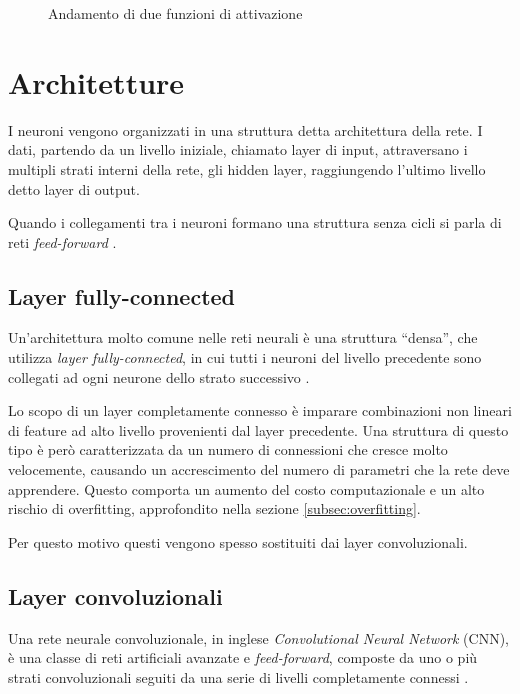 \begin{figure}[htb]
	\centering
	\quad
	
	\caption{Andamento di due funzioni di attivazione}
	\label{fig:subfig}
\end{figure}

\section{Architetture}
\label{sec:architetture}

I neuroni vengono organizzati in una struttura detta architettura della rete.
I dati, partendo da un livello iniziale, chiamato layer di input, attraversano i multipli strati interni della rete, gli hidden layer, raggiungendo l'ultimo livello detto layer di output.

Quando i collegamenti tra i neuroni formano una struttura senza cicli si parla di reti \emph{feed-forward} \cite{svozil1997introduction}.

\subsection{Layer fully-connected}
\label{subsec:fc}

Un’architettura molto comune nelle reti neurali è una struttura ``densa'', che utilizza \emph{layer fully-connected}, in cui tutti i neuroni del livello precedente sono collegati ad ogni neurone dello strato successivo \cite{sainath2015convolutional}.

Lo scopo di un layer completamente connesso è imparare combinazioni non lineari di feature ad alto livello provenienti dal layer precedente. 
Una struttura di questo tipo è però caratterizzata da un numero di connessioni che cresce molto velocemente, causando un accrescimento del numero di parametri che la rete deve apprendere.
Questo comporta un aumento del costo computazionale e un alto rischio di overfitting, approfondito nella sezione \ref{subsec:overfitting}.

Per questo motivo questi vengono spesso sostituiti dai layer convoluzionali.

\subsection{Layer convoluzionali}
\label{subsec:cnn}
Una rete neurale convoluzionale, in inglese \emph{Convolutional Neural Network} (CNN), è una classe di reti artificiali avanzate e \emph{feed-forward}, composte da uno o più strati convoluzionali seguiti da una serie di livelli completamente connessi \cite{kim2014convolutional}.

